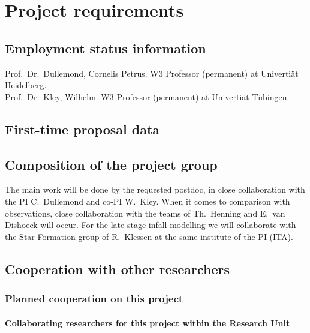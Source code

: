 \documentclass[10pt,fleqn,twoside,a4paper]{article}
\begin{document}
\section{Project requirements}
\renewcommand{\leftmark}{\sc Project requirements}

\subsection{Employment status information}
Prof.~Dr.~Dullemond, Cornelis Petrus.
W3 Professor (permanent) at Univerti\"at Heidelberg.\\
Prof.~Dr.~Kley, Wilhelm.
W3 Professor (permanent) at Univerti\"at T\"ubingen.


\subsection{First-time proposal data}

\subsection{Composition of the project group}

The main work will be done by the requested postdoc, in close collaboration
with the PI C.~Dullemond and co-PI W.~Kley. When it comes to comparison with
observations, close collaboration with the teams of Th.~Henning and E.~van
Dishoeck will occur. For the late stage infall modelling we will collaborate
with the Star Formation group of R.~Klessen at the same institute of the PI
(ITA). 

\subsection{Cooperation with other researchers}

\subsubsection{Planned cooperation on this project}

\paragraph{Collaborating researchers for this project within the
  Research Unit}
\end{document}
